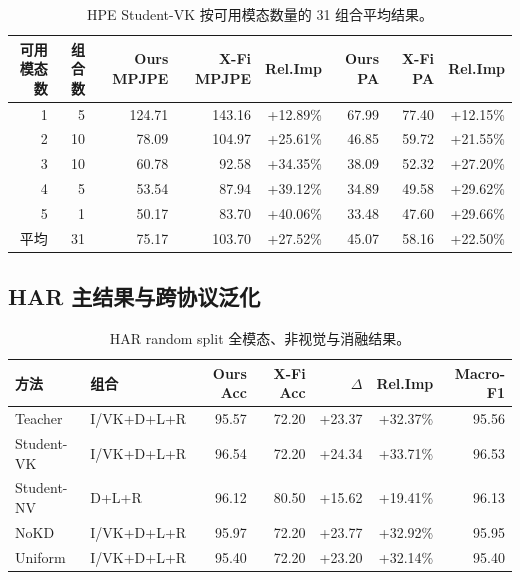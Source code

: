 \documentclass[UTF8,10pt,a4paper]{ctexart}
\newcommand{\better}[1]{\textcolor{ImpBlue}{#1}}
\begin{document}
\begin{table}[H]\centering\small
\caption{HPE Student-VK 按可用模态数量的 31 组合平均结果。}
\begin{tabular}{rrrrrrrr}
\toprule
可用模态数 & 组合数 & Ours MPJPE & X-Fi MPJPE & Rel.Imp & Ours PA & X-Fi PA & Rel.Imp\\
\midrule
1 & 5 & 124.71 & 143.16 & \better{+12.89\%} & 67.99 & 77.40 & \better{+12.15\%}\\
2 & 10 & 78.09 & 104.97 & \better{+25.61\%} & 46.85 & 59.72 & \better{+21.55\%}\\
3 & 10 & 60.78 & 92.58 & \better{+34.35\%} & 38.09 & 52.32 & \better{+27.20\%}\\
4 & 5 & 53.54 & 87.94 & \better{+39.12\%} & 34.89 & 49.58 & \better{+29.62\%}\\
5 & 1 & 50.17 & 83.70 & \better{+40.06\%} & 33.48 & 47.60 & \better{+29.66\%}\\
\midrule
平均 & 31 & 75.17 & 103.70 & \better{+27.52\%} & 45.07 & 58.16 & \better{+22.50\%}\\
\bottomrule
\end{tabular}
\end{table}

\subsection{HAR 主结果与跨协议泛化}
\begin{table}[H]\centering\small
\caption{HAR random split 全模态、非视觉与消融结果。}
\begin{tabular}{llrrrrr}
\toprule
方法 & 组合 & Ours Acc & X-Fi Acc & $\Delta$ & Rel.Imp & Macro-F1\\
\midrule
Teacher & I/VK+D+L+R & 95.57 & 72.20 & \better{+23.37} & \better{+32.37\%} & 95.56\\
Student-VK & I/VK+D+L+R & 96.54 & 72.20 & \better{+24.34} & \better{+33.71\%} & 96.53\\
Student-NV & D+L+R & 96.12 & 80.50 & \better{+15.62} & \better{+19.41\%} & 96.13\\
NoKD & I/VK+D+L+R & 95.97 & 72.20 & \better{+23.77} & \better{+32.92\%} & 95.95\\
Uniform & I/VK+D+L+R & 95.40 & 72.20 & \better{+23.20} & \better{+32.14\%} & 95.40\\
\bottomrule
\end{tabular}
\end{table}
\end{document}
